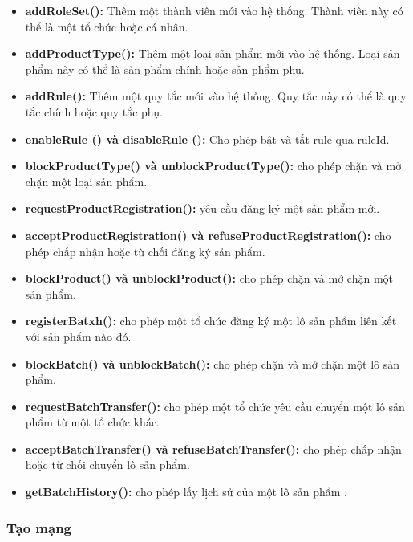\begin{itemize}
    
    \item \textbf{addRoleSet():} Thêm một thành viên mới vào hệ thống. Thành viên này có thể là một tổ chức hoặc cá nhân.
    \item \textbf{addProductType():} Thêm một loại sản phẩm mới vào hệ thống. Loại sản phẩm này có thể là sản phẩm chính hoặc sản phẩm phụ.
    \item \textbf{addRule():} Thêm một quy tắc mới vào hệ thống. Quy tắc này có thể là quy tắc chính hoặc quy tắc phụ.
    \item \textbf{enableRule () và disableRule ():} Cho phép bật và tắt rule qua ruleId.
    \item \textbf{blockProductType() và unblockProductType():} cho phép chặn và mở chặn một loại sản phẩm.
    \item \textbf{requestProductRegistration():} yêu cầu đăng ký một sản phẩm mới.
    \item \textbf{acceptProductRegistration() và refuseProductRegistration():} cho phép chấp nhận hoặc từ chối đăng ký sản phẩm.
    \item \textbf{blockProduct() và unblockProduct():} cho phép chặn và mở chặn một sản phẩm.
    \item \textbf{registerBatxh():} cho phép một tổ chức đăng ký một lô sản phẩm liên kết với sản phẩm nào đó.
    \item \textbf{blockBatch() và unblockBatch():} cho phép chặn và mở chặn một lô sản phẩm.
    \item \textbf{requestBatchTransfer():} cho phép một tổ chức yêu cầu chuyển một lô sản phẩm từ một tổ chức khác.
    \item \textbf{acceptBatchTransfer() và refuseBatchTransfer():} cho phép chấp nhận hoặc từ chối chuyển lô sản phẩm.
    \item \textbf{getBatchHistory():} cho phép lấy lịch sử của một lô sản phẩm \cite{app}.
\end{itemize}
\subsubsection{Tạo mạng}
